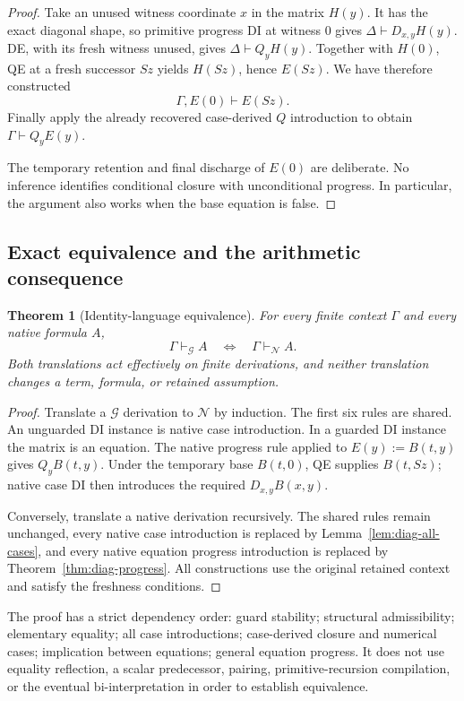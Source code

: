 \documentclass[11pt]{article}
\newtheorem{theorem}{Theorem}[section]
\theoremstyle{definition}
\theoremstyle{remark}
\begin{document}
\begin{proof}
Take an unused witness coordinate $x$ in the matrix $H(y)$.
It has the exact diagonal shape, so primitive progress DI at witness
$0$ gives $\Delta\vdash D_{x,y}H(y)$.
DE, with its fresh witness unused, gives $\Delta\vdash Q_yH(y)$.
Together with $H(0)$, QE at a fresh successor $Sz$ yields $H(Sz)$,
hence $E(Sz)$.  We have therefore constructed
\[
 \Gamma,E(0)\vdash E(Sz).
\]
Finally apply the already recovered case-derived $Q$ introduction to
obtain $\Gamma\vdash Q_yE(y)$.

The temporary retention and final discharge of $E(0)$ are deliberate.
No inference identifies conditional closure with unconditional progress.
In particular, the argument also works when the base equation is false.
\end{proof}

\subsection{Exact equivalence and the arithmetic consequence}

\begin{theorem}[Identity-language equivalence]
\label{thm:diag-equivalence}
For every finite context $\Gamma$ and every native formula $A$,
\[
 \boxed{\quad
 \Gamma\vdash_{\mathcal G}A
 \quad\Longleftrightarrow\quad
 \Gamma\vdash_{\mathcal N}A.
 \quad}
\]
Both translations act effectively on finite derivations, and neither
translation changes a term, formula, or retained assumption.
\end{theorem}
\begin{proof}
Translate a $\mathcal G$ derivation to $\mathcal N$ by induction.
The first six rules are shared.  An unguarded DI instance is native
case introduction.  In a guarded DI instance the matrix is an equation.
The native progress rule applied to $E(y):=B(t,y)$ gives $Q_yB(t,y)$.
Under the temporary base $B(t,0)$, QE supplies $B(t,Sz)$; native case
DI then introduces the required $D_{x,y}B(x,y)$.

Conversely, translate a native derivation recursively.
The shared rules remain unchanged, every native case introduction is
replaced by Lemma~\ref{lem:diag-all-cases}, and every native equation
progress introduction is replaced by
Theorem~\ref{thm:diag-progress}.  All constructions use the original
retained context and satisfy the freshness conditions.
\end{proof}

The proof has a strict dependency order:
guard stability; structural admissibility; elementary equality;
all case introductions; case-derived closure and numerical cases;
implication between equations; general equation progress.
It does not use equality reflection, a scalar predecessor, pairing,
primitive-recursion compilation, or the eventual bi-interpretation in
order to establish equivalence.
\end{document}
